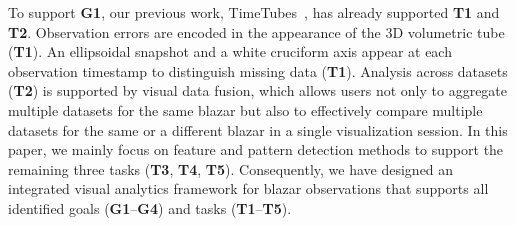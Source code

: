 To support \textbf{G1}, our previous work, TimeTubes~\cite{Fujishiro2018}, has already supported \textbf{T1} and \textbf{T2}.
Observation errors are encoded in the appearance of the 3D volumetric tube (\textbf{T1}).
An ellipsoidal snapshot and a white cruciform axis appear at each observation timestamp to distinguish missing data (\textbf{T1}).
Analysis across datasets (\textbf{T2}) is supported by visual data fusion, which allows users not only to aggregate multiple datasets for the same blazar but also to effectively compare multiple datasets for the same or a different blazar in a single visualization session.
In this paper, we mainly focus on feature and pattern detection methods to support the remaining three tasks (\textbf{T3}, \textbf{T4}, \textbf{T5}).
Consequently, we have designed an integrated visual analytics framework for blazar observations that supports all identified goals (\textbf{G1}--\textbf{G4}) and tasks (\textbf{T1}--\textbf{T5}).



